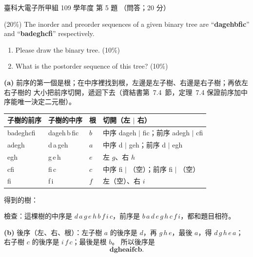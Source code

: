 \begin{pastexam}[label={px:ntust-109-et-ds-05}]{臺科大電子所甲組 109 學年度 第 5 題}
（問答；20 分）

(20\%) The inorder and preorder sequences of a given binary tree are ``\textbf{dagehbfic}'' and
``\textbf{badeghcfi}'' respectively.
\begin{enumerate}[label=(\alph*)]
\item Please draw the binary tree. (10\%)
\item What is the postorder sequence of this tree? (10\%)
\end{enumerate}
\end{pastexam}

\begin{pastsoln}
\textbf{(a)} 前序的第一個是根；在中序裡找到根，左邊是左子樹、右邊是右子樹；再依左右子樹的
大小把前序切開，遞迴下去（資結書第~7.4~節，定理~7.4 保證前序加中序能唯一決定二元樹）。
\begin{center}
\small
\begin{tabular}{llll}
\toprule
子樹的前序 & 子樹的中序 & 根 & 切開（左 $|$ 右） \\
\midrule
badeghcfi & dageh\,b\,fic & $b$ & 中序 dageh $|$ fic；前序 adegh $|$ cfi \\
adegh & d\,a\,geh & $a$ & 中序 d $|$ geh；前序 d $|$ egh \\
egh & g\,e\,h & $e$ & 左 $g$、右 $h$ \\
cfi & fi\,c & $c$ & 中序 fi $|$ （空）；前序 fi $|$ （空） \\
fi & f\,i & $f$ & 左（空）、右 $i$ \\
\bottomrule
\end{tabular}
\end{center}
得到的樹：
\begin{center}
\end{center}
檢查：這棵樹的中序是 $d\,a\,g\,e\,h\,b\,f\,i\,c$，前序是 $b\,a\,d\,e\,g\,h\,c\,f\,i$，都和題目相符。

\textbf{(b)} 後序（左、右、根）：左子樹 $a$ 的後序是 $d$，再 $g\,h\,e$，最後 $a$，得
$d\,g\,h\,e\,a$；右子樹 $c$ 的後序是 $i\,f\,c$；最後是根 $b$。 所以後序是
\[
\textbf{dgheaifcb}.
\]
\end{pastsoln}
